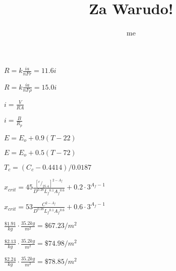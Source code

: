 \documentclass{article}
\begin{document}
\title{Za Warudo!}
\author{me}
\maketitle

\normalsize $ R = k \frac{ia}{nFr} =  11.6i $
\newline

\normalsize $ R = k \frac{ia}{nF\rho} = 15.0i $
\newline

\normalsize $ i = \frac{V}{RA} $
\newline

\normalsize $ i = \frac{B}{R_p} $
\newline

\normalsize $ E = E_o + 0.9(T-22) $
\newline

\normalsize $ E = E_o + 0.5(T-72) $
\newline

\normalsize $ T_c = (C_c - 0.4414)/0.0187 $
\newline

\LARGE $ x_{crit} = 45  \frac{{[^c/_{25.4}]} ^{2-A_f}}{D^{0.38}L{_f}^{0.1}A{_f}^{0.6}} + 0.2 \cdot 3^{A_f-1} $
\newline

\normalsize $ x_{crit} = 53  \frac{C^{2-A_f}}{D^{0.38}L{_f}^{0.1}A{_f}^{0.6}} + 0.6 \cdot 3^{A_f-1} $
\newline

\normalsize $ \frac{\$1.91}{kg} \cdot \frac{35.2kg}{m^2} = \$67.23/m^2 $
\newline

\normalsize $ \frac{\$2.13}{kg} \cdot \frac{35.2kg}{m^2} = \$74.98/m^2 $
\newline

\normalsize $ \frac{\$2.24}{kg} \cdot \frac{35.2kg}{m^2} = \$78.85/m^2 $
\newline
\end{document}
